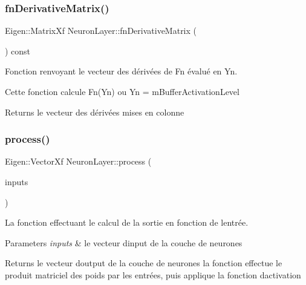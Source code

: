 \subsubsection{\texorpdfstring{fn\+Derivative\+Matrix()}{fnDerivativeMatrix()}}
{\footnotesize\ttfamily Eigen\+::\+Matrix\+Xf Neuron\+Layer\+::fn\+Derivative\+Matrix (\begin{DoxyParamCaption}{ }\end{DoxyParamCaption}) const\hspace{0.3cm}{\ttfamily [private]}}



Fonction renvoyant le vecteur des dérivées de Fn évalué en Yn. 

Cette fonction calcule Fn\textquotesingle{}(Yn) ou Yn = m\+Buffer\+Activation\+Level \begin{DoxyReturn}{Returns}
le vecteur des dérivées mises en colonne 
\end{DoxyReturn}
\mbox{\label{classNeuronLayer_aa374ba7d040ae618b5037aa88e5efae7}} 
\subsubsection{\texorpdfstring{process()}{process()}}
{\footnotesize\ttfamily Eigen\+::\+Vector\+Xf Neuron\+Layer\+::process (\begin{DoxyParamCaption}\item[{Eigen\+::\+Vector\+Xf}]{inputs }\end{DoxyParamCaption})}



La fonction effectuant le calcul de la sortie en fonction de l\textquotesingle{}entrée. 


\begin{DoxyParams}{Parameters}
{\em inputs} & le vecteur d\textquotesingle{}input de la couche de neurones \\
\hline
\end{DoxyParams}
\begin{DoxyReturn}{Returns}
le vecteur d\textquotesingle{}output de la couche de neurones la fonction effectue le produit matriciel des poids par les entrées, puis applique la fonction d\textquotesingle{}activation 
\end{DoxyReturn}
\mbox{\label{classNeuronLayer_af4f8a2ea263ab0c242124571db916d73}} 
